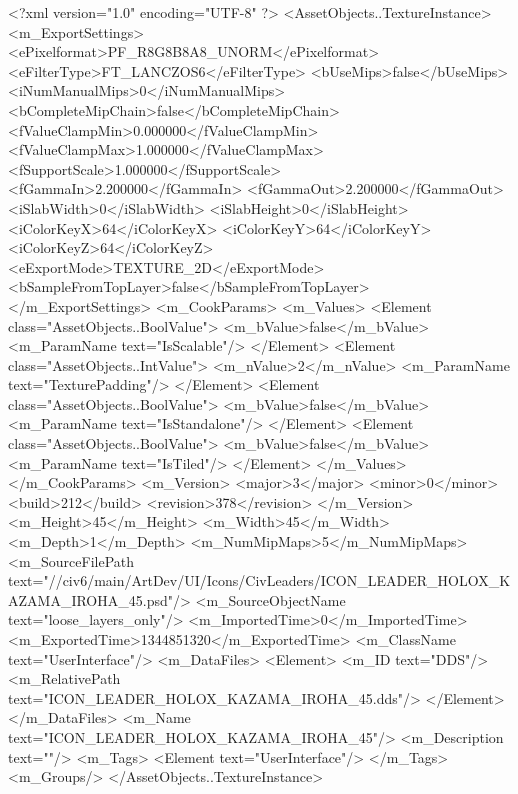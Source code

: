 <?xml version="1.0" encoding="UTF-8" ?>
<AssetObjects..TextureInstance>
	<m_ExportSettings>
		<ePixelformat>PF_R8G8B8A8_UNORM</ePixelformat>
		<eFilterType>FT_LANCZOS6</eFilterType>
		<bUseMips>false</bUseMips>
		<iNumManualMips>0</iNumManualMips>
		<bCompleteMipChain>false</bCompleteMipChain>
		<fValueClampMin>0.000000</fValueClampMin>
		<fValueClampMax>1.000000</fValueClampMax>
		<fSupportScale>1.000000</fSupportScale>
		<fGammaIn>2.200000</fGammaIn>
		<fGammaOut>2.200000</fGammaOut>
		<iSlabWidth>0</iSlabWidth>
		<iSlabHeight>0</iSlabHeight>
		<iColorKeyX>64</iColorKeyX>
		<iColorKeyY>64</iColorKeyY>
		<iColorKeyZ>64</iColorKeyZ>
		<eExportMode>TEXTURE_2D</eExportMode>
		<bSampleFromTopLayer>false</bSampleFromTopLayer>
	</m_ExportSettings>
	<m_CookParams>
		<m_Values>
			<Element class="AssetObjects..BoolValue">
				<m_bValue>false</m_bValue>
				<m_ParamName text="IsScalable"/>
			</Element>
			<Element class="AssetObjects..IntValue">
				<m_nValue>2</m_nValue>
				<m_ParamName text="TexturePadding"/>
			</Element>
			<Element class="AssetObjects..BoolValue">
				<m_bValue>false</m_bValue>
				<m_ParamName text="IsStandalone"/>
			</Element>
			<Element class="AssetObjects..BoolValue">
				<m_bValue>false</m_bValue>
				<m_ParamName text="IsTiled"/>
			</Element>
		</m_Values>
	</m_CookParams>
	<m_Version>
		<major>3</major>
		<minor>0</minor>
		<build>212</build>
		<revision>378</revision>
	</m_Version>
	<m_Height>45</m_Height>
	<m_Width>45</m_Width>
	<m_Depth>1</m_Depth>
	<m_NumMipMaps>5</m_NumMipMaps>
	<m_SourceFilePath text="//civ6/main/ArtDev/UI/Icons/CivLeaders/ICON_LEADER_HOLOX_KAZAMA_IROHA_45.psd"/>
	<m_SourceObjectName text="loose_layers_only"/>
	<m_ImportedTime>0</m_ImportedTime>
	<m_ExportedTime>1344851320</m_ExportedTime>
	<m_ClassName text="UserInterface"/>
	<m_DataFiles>
		<Element>
			<m_ID text="DDS"/>
			<m_RelativePath text="ICON_LEADER_HOLOX_KAZAMA_IROHA_45.dds"/>
		</Element>
	</m_DataFiles>
	<m_Name text="ICON_LEADER_HOLOX_KAZAMA_IROHA_45"/>
	<m_Description text=""/>
	<m_Tags>
		<Element text="UserInterface"/>
	</m_Tags>
	<m_Groups/>
</AssetObjects..TextureInstance>

